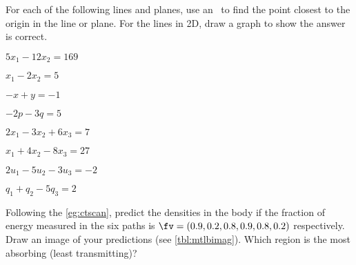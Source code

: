
\begin{exercise}  
For each of the following lines and planes,
use an \svd\ to find the point closest to the origin in the line or plane.
For the lines in 2D, draw a graph to show the answer is correct.
\begin{Parts}
\item \(5x_1-12x_2=169\)

\item \(x_1-2x_2=5\)

\begin{OmitV1}
\item \(-x+y=-1\)

\item \(-2p-3q=5\)
\end{OmitV1}

\item \(2x_1-3x_2+6x_3=7\)

\begin{OmitV1}
\item \(x_1+4x_2-8x_3=27\)

\item \(2u_1-5u_2-3u_3=-2\)
\end{OmitV1}

\item \(q_1+q_2-5q_3=2\)

\end{Parts}
\end{exercise}



\begin{exercise}  
Following the  \cref{eg:ctscan}, predict the densities in the body if the fraction of  energy measured in the six paths is \(\sloppy\fv=(0.9, 0.2, 0.8, 0.9, 0.8, 0.2)\) respectively.  
Draw an image of your predictions (see \cref{tbl:mtlbimag}).  Which region is the most absorbing (least transmitting)?
\end{exercise}

